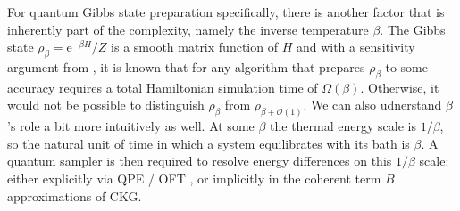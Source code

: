 For quantum Gibbs state preparation specifically, there is another factor that is inherently part of the complexity, namely the inverse temperature $\beta$. The Gibbs state $\rho_\beta = \mathrm{e}^{-\beta H}/Z$ is a smooth matrix function of $H$ and with a sensitivity argument from \cite[Prop.~G.5]{chen2023quantum}, it is known that for any algorithm that prepares $\rho_\beta$ to some accuracy requires a total Hamiltonian simulation time of $\Omega(\beta)$. Otherwise, it would not be possible to distinguish $\rho_\beta$ from $\rho_{\beta + \mathcal{O}(1)}$. We can also udnerstand $\beta$'s role a bit more intuitively as well. At some $\beta$ the thermal energy scale is $1 / \beta$, so the natural unit of time in which a system equilibrates with its bath is $\beta$. A quantum sampler is then required to resolve energy differences on this $1 / \beta$ scale: either explicitly via QPE \cite{temme2011quantum} / OFT \cite{chen2023quantum}, or implicitly in the coherent term $B$ approximations of CKG.

\smallskip
\label{sec:parent-ham}
